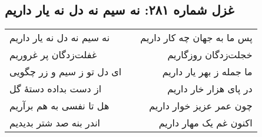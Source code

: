 \begin{center}
\section*{غزل شماره ۲۸۱: نه سیم نه دل نه یار داریم}
\label{sec:281}
\begin{longtable}{l p{0.5cm} r}
نه سیم نه دل نه یار داریم
&&
پس ما به جهان چه کار داریم
\\
غفلت‌زدگان پر غروریم
&&
خجلت‌زدگان روزگاریم
\\
ای دل تو ز سیم و زر چگویی
&&
ما جمله ز بهر یار داریم
\\
از دست بداده دستهٔ گل
&&
در پای هزار خار داریم
\\
هل تا نفسی به هم برآریم
&&
چون عمر عزیز خوار داریم
\\
اندر بنه صد شتر بدیدیم
&&
اکنون غم یک مهار داریم
\\
\end{longtable}
\end{center}
